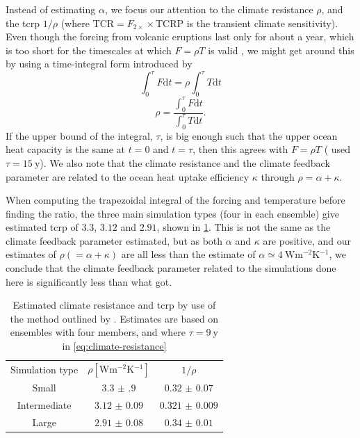 \documentclass{ametsocV5}
\begin{document}
Instead of estimating \(\alpha \), we focus our attention to the climate resistance
\(\rho \), and the \ac{tcrp} \(1/\rho\) (where \(\mathrm{TCR}=F_{2\times}\times
\mathrm{TCRP}\) is the transient climate sensitivity). Even though the forcing from
volcanic eruptions last only for about a year, which is too short for the timescales at
which \(F=\rho T\) is valid \citep{gregory2016}, we might get around this by using a
time-integral form introduced by \citet{merlis2014}
\begin{equation}
  \int_0^{\tau}F \mathrm{d}t=\rho\int_{0}^{\tau}T \mathrm{d}t
\end{equation}
\begin{equation}
  \rho=\frac{\int_0^{\tau}F \mathrm{d}t}{\int_{0}^{\tau}T \mathrm{d}t}.
  \label{eq:climate-resistance}
\end{equation}
%
If the upper bound of the integral, \(\tau \), is big enough such that the upper ocean
heat capacity is the same at \(t=0\) and \(t=\tau \), then this agrees with \(F=\rho T\)
\citep{gregory2016} (\citet{merlis2014} used \(\tau =\SI{15}{\mathrm{y}}\)). We also
note that the climate resistance and the climate feedback parameter are related to the
ocean heat uptake efficiency \(\kappa \) through \(\rho =\alpha +\kappa \).

When computing the trapezoidal integral of the forcing and temperature before finding
the ratio, the three main simulation types (four in each ensemble) give estimated
\ac{tcrp} of \(3.3\), \(3.12\) and \(2.91\), shown in \cref{tab:trcp}. This is not the
same as the climate feedback parameter \citet{jones2005} estimated, but as both \(\alpha
\) and \(\kappa \) are positive, and our estimates of \(\rho (=\alpha +\kappa) \) are
all less than the \citet{jones2005} estimate of \(\alpha \simeq
\SI{4}{\watt\metre^{-2}\kelvin^{-1}}\), we conclude that the climate feedback parameter
related to the simulations done here is significantly less than what \citet{jones2005}
got.

\begin{table}
  \centering
  \caption{Estimated climate resistance and \ac{tcrp} by use of the method outlined by
    \citet{merlis2014}. Estimates are based on ensembles with four members, and where
    \(\tau =\SI{9}{\mathrm{y}}\) in \cref{eq:climate-resistance}}%
  \label{tab:trcp}
  \begin{tabular}{ccc}
    Simulation type & \(\rho [\si{\watt\metre^{-2}\kelvin^{-1}}]\) & \(1/\rho\)         \\
    Small           & \(\num{3.3(9)}\)                             & \(\num{0.32(7)}\)  \\
    Intermediate    & \(\num{3.12(9)}\)                            & \(\num{0.321(9)}\) \\
    Large           & \(\num{2.91(8)}\)                            & \(\num{0.34(1)}\)  \\
  \end{tabular}
\end{table}
\end{document}
